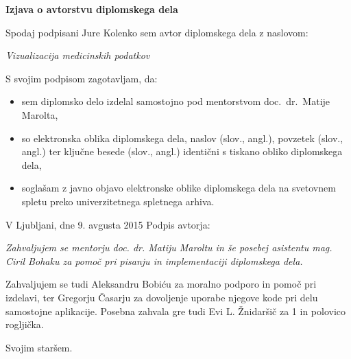 \documentclass[a4paper, 12pt]{book}
\newcommand{\clearemptydoublepage}{\newpage{\pagestyle{empty}\cleardoublepage}}
\begin{document}
\vspace{2cm}

\clearemptydoublepage

\vspace*{1cm}
\begin{center}
{\Large \textbf{\sc Izjava o avtorstvu diplomskega dela}}
\end{center}

\vspace{1cm}
\noindent Spodaj podpisani Jure Kolenko sem avtor  diplomskega dela z naslovom:

\vspace{0.5cm}
\emph{Vizualizacija medicinskih podatkov}

\vspace{1.5cm}
\noindent S svojim podpisom zagotavljam, da:
\begin{itemize}
	\item sem diplomsko delo izdelal samostojno pod mentorstvom
		doc.\ dr.\ Matije Marolta,

	\item	so elektronska oblika diplomskega dela, naslov (slov., angl.), povzetek (slov., angl.) ter ključne besede (slov., angl.) identični s tiskano obliko diplomskega dela,
	\item soglašam z javno objavo elektronske oblike diplomskega dela na svetovnem spletu preko univerzitetnega spletnega arhiva.	
\end{itemize}

\vspace{1cm}
\noindent V Ljubljani, dne 9. avgusta 2015 \hfill Podpis avtorja:

\clearemptydoublepage

\thispagestyle{empty}\mbox{}\vfill\null\it%
Zahvaljujem se mentorju doc. dr. Matiju Maroltu in še posebej asistentu mag. Ciril Bohaku za pomoč pri pisanju in implementaciji diplomskega dela. 

Zahvaljujem se tudi Aleksandru Bobiću za moralno podporo in pomoč pri izdelavi, ter Gregorju Časarju za dovoljenje uporabe njegove kode pri delu samostojne aplikacije. Posebna zahvala gre tudi Evi L. Žnidaršič za 1\EUR{} in polovico rogljička.
\rm\normalfont

\clearemptydoublepage

\thispagestyle{empty}\mbox{}{\textheight}\mbox{}\hfill\begin{minipage}{0.55\textwidth}%
\normalfont\end{minipage}
Svojim staršem.
\clearemptydoublepage
\end{document}
